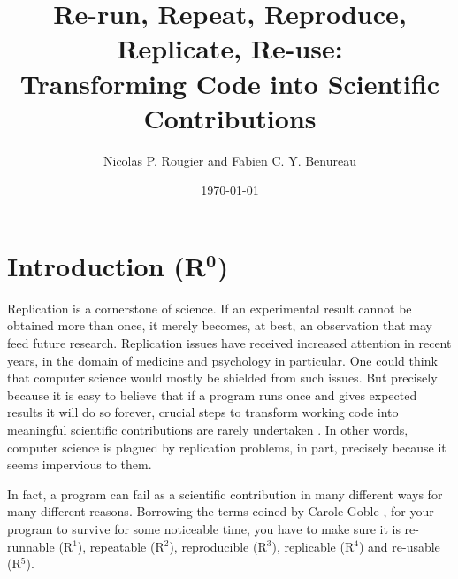 \documentclass[a4paper,11pt]{article}
\title{Re-run, Repeat, Reproduce, Replicate, Re-use:\\Transforming Code into Scientific Contributions}
\author{Nicolas P. Rougier and Fabien C. Y. Benureau}
\date{\today}
\begin{document}
\maketitle

\section*{Introduction (R$^{\mathbf 0}$)}

Replication is a cornerstone of science. 
% 
% 
% 
% 
% 
% 
%
%
If an experimental result cannot be obtained more than once,
it merely becomes, at best, an observation that
may feed future research. 
Replication issues have received increased attention in recent years,
in the domain of medicine and psychology in particular.
One could think that computer science would mostly be shielded from such issues.
But precisely because it is easy to believe that
if a program runs once and gives expected results it will do so forever, 
crucial steps to transform working code into meaningful scientific contributions are rarely undertaken \cite{Collberg:2016}. 
In other words, computer science is plagued by replication problems,
in part, precisely because it seems impervious to them.

In fact, a program can fail as a scientific contribution
in many different ways for many different reasons.
Borrowing the terms coined by Carole Goble \cite{Goble:2016},
for your program to survive for some noticeable time,
you have to make sure it is
re-runnable (R$^1$),
repeatable (R$^2$),
reproducible (R$^3$),
replicable (R$^4$)
and re-usable (R$^5$).\\
\end{document}
